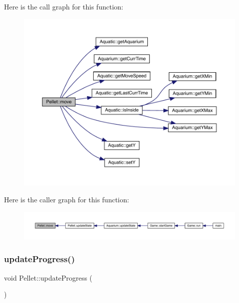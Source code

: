 Here is the call graph for this function\+:\nopagebreak
\begin{figure}[H]
\begin{center}
\leavevmode
\includegraphics[width=350pt]{class_pellet_a7385101b04083be663ae465c38fd2a4d_cgraph}
\end{center}
\end{figure}
Here is the caller graph for this function\+:\nopagebreak
\begin{figure}[H]
\begin{center}
\leavevmode
\includegraphics[width=350pt]{class_pellet_a7385101b04083be663ae465c38fd2a4d_icgraph}
\end{center}
\end{figure}
\mbox{\label{class_pellet_a1a7203cff52c771eb8cc62a91620e3ca}} 
\subsubsection{\texorpdfstring{update\+Progress()}{updateProgress()}}
{\footnotesize\ttfamily void Pellet\+::update\+Progress (\begin{DoxyParamCaption}{ }\end{DoxyParamCaption})\hspace{0.3cm}{\ttfamily [virtual]}}



